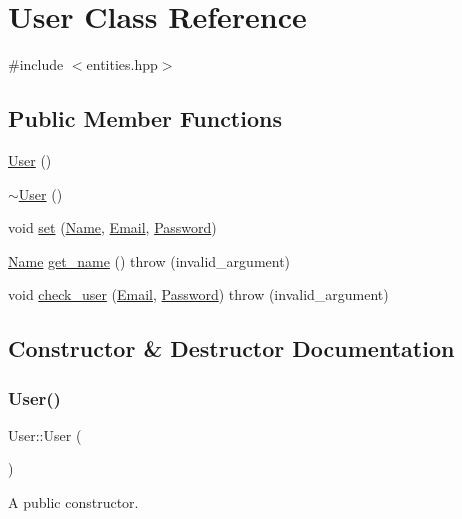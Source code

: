 \hypertarget{class_user}{}\section{User Class Reference}
\label{class_user}


{\ttfamily \#include $<$entities.\+hpp$>$}

\subsection*{Public Member Functions}
\begin{DoxyCompactItemize}
\item 
\hyperlink{class_user_a4a0137053e591fbb79d9057dd7d2283d}{User} ()
\item 
\hyperlink{class_user_ac00b72ad64eb4149f7b21b9f5468c2b2}{$\sim$\+User} ()
\item 
void \hyperlink{class_user_a0ecc593131bdfb1f17364ffe033d7094}{set} (\hyperlink{class_name}{Name}, \hyperlink{class_email}{Email}, \hyperlink{class_password}{Password})
\item 
\hyperlink{class_name}{Name} \hyperlink{class_user_af992bab722091aafb2024d4eacf80c59}{get\+\_\+name} ()  throw (invalid\+\_\+argument)
\item 
void \hyperlink{class_user_ad633c8904f8955905275932b19f283cf}{check\+\_\+user} (\hyperlink{class_email}{Email}, \hyperlink{class_password}{Password})  throw (invalid\+\_\+argument)
\end{DoxyCompactItemize}


\subsection{Constructor \& Destructor Documentation}
\mbox{\label{class_user_a4a0137053e591fbb79d9057dd7d2283d}} 
\subsubsection{\texorpdfstring{User()}{User()}}
{\footnotesize\ttfamily User\+::\+User (\begin{DoxyParamCaption}{ }\end{DoxyParamCaption})}

A public constructor. \mbox{\label{class_user_ac00b72ad64eb4149f7b21b9f5468c2b2}} 
